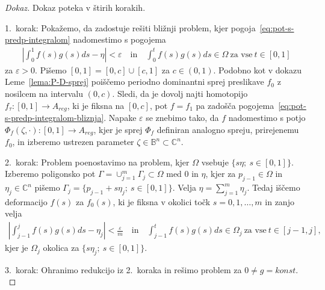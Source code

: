 \documentclass[12pt,a4paper,twoside]{article}
\theoremstyle{definition} %
\newenvironment{dokaz}[1][Dokaz]{\begin{proof}[#1]}{\end{proof}}
\theoremstyle{plain} %
\numberwithin{equation}{section}  %
\begin{document}
\begin{dokaz}
Dokaz poteka v štirih korakih.

1.~korak: Pokažemo, da zadostuje rešiti bližnji problem, kjer pogoja~\eqref{eq:pot-s-predp-integralom} nadomestimo s pogojema
\begin{gather} \label{eq:pot-s-predp-integralom-bliznja}
\left| \int_{0}^{1} f(s)g(s)ds - \eta \right| < \varepsilon \quad \textrm{in} \quad \int_{0}^{t} f(s)g(s)ds \in \Omega \ \textrm{za vse} \ t \in [0,1]
\end{gather}
za $\varepsilon > 0$.
Pišemo $[0,1] = [0,c] \cup [c,1]$ za $c \in (0,1)$.
Podobno kot v dokazu Leme~\ref{lema:P-D-sprej} poiščemo periodno dominantni sprej preslikave $f_0$ z nosilcem na intervalu $(0,c)$.
Sledi, da je dovolj najti homotopijo $f_{\tau} \colon [0,1] \to A_{reg}$, ki je fiksna na $[0,c]$, pot $f = f_{1}$ pa zadošča pogojema~\eqref{eq:pot-s-predp-integralom-bliznja}. Napake $\varepsilon$ se znebimo tako, da $f$ nadomestimo s potjo $\Phi_{f}(\zeta, \cdot) \colon [0,1] \to A_{reg}$, kjer je sprej $\Phi_{f}$ definiran analogno spreju, prirejenemu $f_0$, in izberemo ustrezen parameter $\zeta \in \mathbb{B}^{n} \subset \mathbb{C}^{n}$.

2.~korak: Problem poenostavimo na problem, kjer $\Omega$ vsebuje $\{ s\eta; \ s \in [0,1] \}$. \newline
Izberemo poligonsko pot $\Gamma = \cup_{j=1}^{m} \Gamma_{j} \subset \Omega$ med $0$ in $\eta$, kjer za $p_{j-1} \in \Omega$ in $\eta_{j} \in \mathbb{C}^{n}$ pišemo $\Gamma_{j} = \{ p_{j-1} + s\eta_{j}; \ s \in [0,1] \}$.
Velja $\eta = \sum_{j=1}^{m} \eta_{j}$.
Tedaj iščemo deformacijo $f(s)$ za $f_0(s)$, ki je fiksna v okolici točk $s = 0, 1, \dots , m$ in zanjo velja
\begin{gather*}
\left| \int_{j-1}^{j} f(s)g(s)ds - \eta_{j} \right| < \frac{\varepsilon}{m} \quad \textrm{in} \quad \int_{j-1}^{t} f(s)g(s)ds \in \Omega_{j} \ \textrm{za vse} \ t \in [j-1,j],
\end{gather*}
kjer je $\Omega_{j}$ okolica za $\{ s \eta_{j}; \ s \in [0,1] \}$.

3.~korak: Ohranimo redukcijo iz 2.~koraka in rešimo problem za $0 \neq g = konst.$


\end{dokaz}
\end{document}

